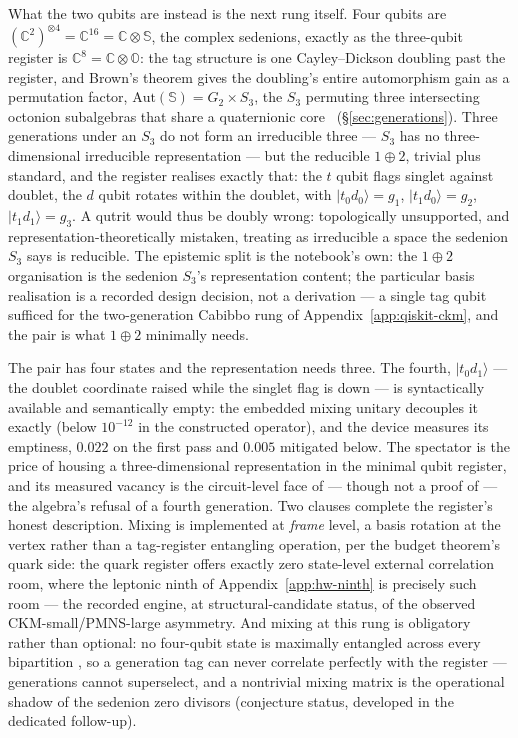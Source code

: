 What the two qubits are instead is the next rung itself. Four qubits are
$(\mathbb{C}^{2})^{\otimes 4} = \mathbb{C}^{16} = \mathbb{C} \otimes \mathbb{S}$, the complex
sedenions, exactly as the three-qubit register is
$\mathbb{C}^{8} = \mathbb{C} \otimes \mathbb{O}$: the tag structure is one Cayley--Dickson
doubling past the register, and Brown's theorem gives the doubling's entire automorphism gain as a
permutation factor, $\mathrm{Aut}(\mathbb{S}) = G_{2} \times S_{3}$, the $S_{3}$ permuting three
intersecting octonion subalgebras that share a quaternionic
core~\autocite{gillardgresnigt2019three} (\S\ref{sec:generations}). Three generations under an
$S_{3}$ do not form an irreducible three --- $S_{3}$ has no three-dimensional irreducible
representation --- but the reducible $1 \oplus 2$, trivial plus standard, and the register
realises exactly that: the $t$ qubit flags singlet against doublet, the $d$ qubit rotates within
the doublet, with $\lvert t_{0} d_{0}\rangle = g_{1}$, $\lvert t_{1} d_{0}\rangle = g_{2}$,
$\lvert t_{1} d_{1}\rangle = g_{3}$. A qutrit would thus be doubly wrong: topologically
unsupported, and representation-theoretically mistaken, treating as irreducible a space the
sedenion $S_{3}$ says is reducible. The epistemic split is the notebook's own: the $1 \oplus 2$
organisation is the sedenion $S_{3}$'s representation content; the particular basis realisation is
a recorded design decision, not a derivation --- a single tag qubit sufficed for the
two-generation Cabibbo rung of Appendix~\ref{app:qiskit-ckm}, and the pair is what $1 \oplus 2$
minimally needs.

The pair has four states and the representation needs three. The fourth,
$\lvert t_{0} d_{1}\rangle$ --- the doublet coordinate raised while the singlet flag is down ---
is syntactically available and semantically empty: the embedded mixing unitary decouples it
exactly (below $10^{-12}$ in the constructed operator), and the device measures its emptiness,
$0.022$ on the first pass and $0.005$ mitigated below. The spectator is the price of housing a
three-dimensional representation in the minimal qubit register, and its measured vacancy is the
circuit-level face of --- though not a proof of --- the algebra's refusal of a fourth generation.
Two clauses complete the register's honest description. Mixing is implemented at \emph{frame}
level, a basis rotation at the vertex rather than a tag-register entangling operation, per the
budget theorem's quark side: the quark register offers exactly zero state-level external
correlation room, where the leptonic ninth of Appendix~\ref{app:hw-ninth} is precisely such room
--- the recorded engine, at structural-candidate status, of the observed CKM-small/PMNS-large
asymmetry. And mixing at this rung is obligatory rather than optional: no four-qubit state is
maximally entangled across every bipartition \autocite{higuchisudbery2000}, so a generation tag
can never correlate perfectly with the register --- generations cannot superselect, and a
nontrivial mixing matrix is the operational shadow of the sedenion zero divisors (conjecture
status, developed in the dedicated follow-up).

